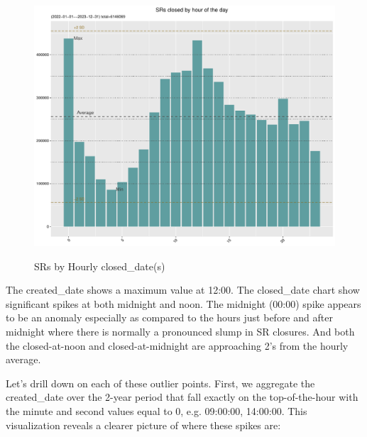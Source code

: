 \documentclass[12pt, titlepage]{article}
\begin{document}
{	\begin{figure}[tbp]
		 \centering
		 \caption{SRs by Hourly closed\_date(s)}
		 \includegraphics[width = \textwidth]{Closed_Hourly_SR_count.pdf}
		 \label{fig:hourly-closed}
	\end{figure}	
	
	The created\_date shows a maximum value at 12:00. The closed\_date chart show significant spikes at both midnight
	and noon. The midnight (00:00) spike appears to be an anomaly especially as compared to the hours just 
	before and after midnight where there is normally a pronounced slump in SR closures. 
	And both the closed-at-noon and closed-at-midnight are approaching 2\textsigma's from the hourly average. 

	Let's drill down on each of these outlier points. First, we aggregate the created\_date over the 2-year period that fall exactly
	on the top-of-the-hour with the minute and second values equal to 0, e.g. 09:00:00, 14:00:00. This visualization
	reveals a clearer picture of where these spikes are:
	
}
\end{document}
